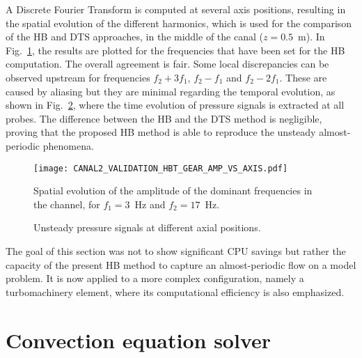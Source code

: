 A Discrete Fourier Transform is computed at several axis positions,
resulting in the spatial evolution of the different harmonics, which
is used for the comparison of the HB and DTS approaches, in the middle
of the canal ($z = 0.5$~m).  In
Fig.~\ref{fig:canal2_validation_hbt_gear_amp_vs_axis}, the results are
plotted for the frequencies that have been set for the HB computation.
The overall agreement is fair.  Some local discrepancies can be
observed upstream for frequencies $f_2 + 3f_1$, $f_2 - f_1$ and $f_2 -
2f_1$. These are caused by aliasing
 but they are minimal regarding the temporal evolution, as
shown in Fig.~\ref{fig:canal2_validation_hbt_gear_time_ev}, where the
time evolution of pressure signals is extracted at all probes.  The
difference between the HB and the DTS method is negligible, proving
that the proposed HB method is able to reproduce the unsteady
almost-periodic phenomena.
\begin{figure}[htbp]
  \centering
  \texttt{[image: CANAL2\_VALIDATION\_HBT\_GEAR\_AMP\_VS\_AXIS.pdf]}
  \caption{Spatial evolution of the amplitude of the dominant
    frequencies in the channel, for $f_1 = 3$~Hz and $f_2 = 17$~Hz.}
  \label{fig:canal2_validation_hbt_gear_amp_vs_axis}
\end{figure}

\begin{figure}[htb]
  \centering 
   \quad{}
  \caption{Unsteady pressure signals at different axial positions.}
  \label{fig:canal2_validation_hbt_gear_time_ev}
\end{figure}

The goal of this section was not to show significant CPU savings but
rather the capacity of the present HB method to capture an
almost-periodic flow on a model problem.  It is now applied to a more
complex configuration, namely a turbomachinery element, where its
computational efficiency is also emphasized.






\section{Convection equation solver}




